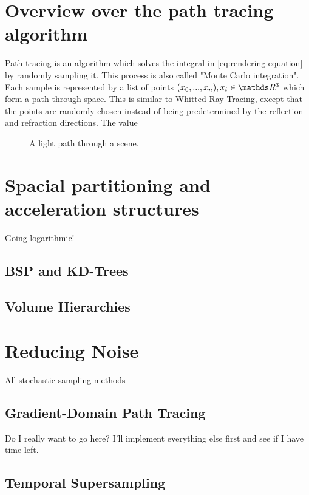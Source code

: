 \documentclass{ACGSeminar}
\begin{document}
\section{Overview over the path tracing algorithm} \label{path-tracing}
Path tracing is an algorithm which solves the integral in \eqref{eq:rendering-equation} by randomly sampling it. This process is also called "Monte Carlo integration". Each sample is represented by a list of points $(x_0, ..., x_n), x_i \in \R^3$ which form a path through space. This is similar to Whitted Ray Tracing, except that the points are randomly chosen instead of being predetermined by the reflection and refraction directions. The value 

\begin{figure}[htb!]
  \begin{centering}
    \par
  \end{centering}
  \caption{A light path through a scene.}
  \label{fig:light-path}
\end{figure}


\section{Spacial partitioning and acceleration structures} \label{acceleration}
Going logarithmic!
\subsection{BSP and KD-Trees}

\subsection{Volume Hierarchies}

\section{Reducing Noise} \label{noise}
All stochastic sampling methods 
\subsection{Gradient-Domain Path Tracing}
Do I really want to go here? \cite{Kettunen2015sg} I'll implement everything else first and see if I have time left.
\subsection{Temporal Supersampling}
\end{document}
